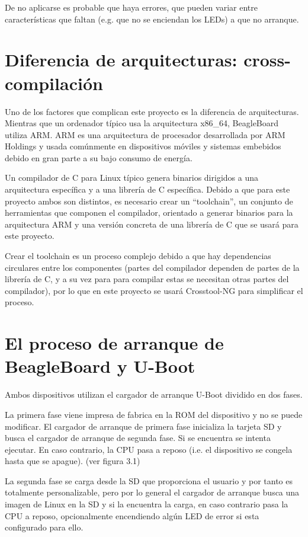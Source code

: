 \documentclass{tfg}
\begin{document}
De no aplicarse es probable que haya errores, que pueden variar entre características que faltan (e.g. que no se enciendan los LEDs) a que no arranque.

\section{Diferencia de arquitecturas: cross-compilación}
Uno de los factores que complican este proyecto es la diferencia de arquitecturas. Mientras que un ordenador típico usa la arquitectura x86\_64, BeagleBoard utiliza ARM. ARM es una arquitectura de procesador desarrollada por ARM Holdings \cite{arm} y usada comúnmente en dispositivos móviles y sistemas embebidos debido en gran parte a su bajo consumo de energía.

Un compilador de C para Linux típico genera binarios dirigidos a una arquitectura específica y a una librería de C específica. Debido a que para este proyecto ambos son distintos, es necesario crear un ``toolchain'', un conjunto de herramientas que componen el compilador, orientado a generar binarios para la arquitectura ARM y una versión concreta de una librería de C que se usará para este proyecto.

Crear el toolchain es un proceso complejo debido a que hay dependencias circulares entre los componentes (partes del compilador dependen de partes de la librería de C, y a su vez para para compilar estas se necesitan otras partes del compilador), por lo que en este proyecto se usará Crosstool-NG para simplificar el proceso.

\section{El proceso de arranque de BeagleBoard y U-Boot}
Ambos dispositivos utilizan el cargador de arranque U-Boot dividido en dos fases.

La primera fase viene impresa de fabrica en la ROM del dispositivo y no se puede modificar. El cargador de arranque de primera fase inicializa la tarjeta SD y busca el cargador de arranque de segunda fase. Si se encuentra se intenta ejecutar. En caso contrario, la CPU pasa a reposo (i.e. el dispositivo se congela hasta que se apague). (ver figura 3.1)

La segunda fase se carga desde la SD que proporciona el usuario y por tanto es totalmente personalizable, pero por lo general el cargador de arranque busca una imagen de Linux en la SD y si la encuentra la carga, en caso contrario pasa la CPU a reposo, opcionalmente encendiendo algún LED de error si esta configurado para ello.
\end{document}
